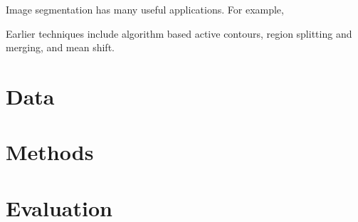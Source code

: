 \documentclass{article} %
\begin{document}
Image segmentation has many useful applications. For example, 

 Earlier techniques include algorithm based active contours, region splitting and merging, and mean shift.



\section{Data}

\section{Methods}

\section{Evaluation}




\end{document}
